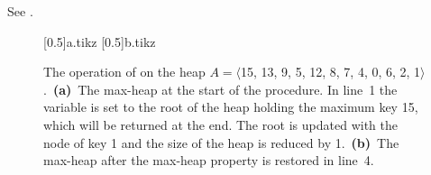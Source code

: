 See .
\begin{figure}[htb]
    \captionsetup[subfigure]{}
    \subcaptionbox{\label{fig:6.5-1a}}[0.5\textwidth]{{a.tikz}}
    \subcaptionbox{\label{fig:6.5-1b}}[0.5\textwidth]{{b.tikz}}
    \caption{The operation of  on the heap $A=\langle$15, 13, 9, 5, 12, 8, 7, 4, 0, 6, 2, 1$\rangle$.\,
    \textbf{(a)}\, The max-heap at the start of the procedure.
    In line~1 the variable  is set to the root of the heap holding the maximum key 15, which will be returned at the end.
    The root is updated with the node of key 1 and the size of the heap is reduced by 1.\,
    \textbf{(b)}\, The max-heap after the max-heap property is restored in line~4.} \label{fig:6.5-1}
\end{figure}
